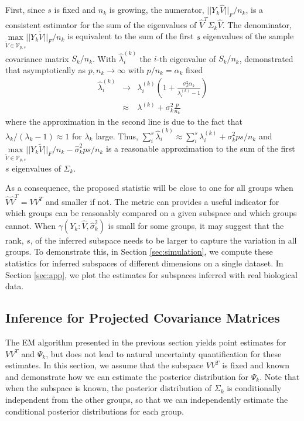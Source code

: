 \documentclass[12pt]{article}
\begin{document}
First, since $s$ is fixed and $n_k$ is growing, the numerator,
$||Y_k\hat{V}||_F/n_k$, is a consistent estimator for the sum of the
eigenvalues of $\hat{V}^T\Sigma_k\hat{V}$.  The denominator,
$\underset{\widetilde{V} \in \mathcal{V}_{p,
    s}}{\text{max}}||Y_k\widetilde{V}||_F/n_k$
is equivalent to the sum of the first $s$ eigenvalues of the sample
covariance matrix $S_k/n_k$.  With $\hat{\lambda}^{(k)}_i$ the
$i$-th eigenvalue of $S_k/n_k$, \citet{Baik2006} demonstrated that
asymptotically as $p, n_k \rightarrow \infty$ with $p/n_k = \alpha_k$
fixed
%
\begin{eqnarray}
\nonumber \hat{\lambda}^{(k)}_i &\rightarrow& \lambda^{(k)}_i\left(1 +
                                    \frac{\sigma_k^2\alpha_k}{\lambda^{(k)}_i
                                    - 1}\right)\\
& \approx& \lambda^{(k)} + \sigma^2_k\frac{p}{n_k}
\end{eqnarray}
%
\noindent where the approximation in the second line is due to the
fact that $\lambda_k/(\lambda_k - 1) \approx 1$ for $\lambda_k$
large. Thus,
$\sum_i^s \hat{\lambda}^{(k)}_i \approx \sum_i^s \lambda^{(k)}_i +
\sigma_k^2ps/n_k$
and $\underset{\widetilde{V} \in \mathcal{V}_{p, s}}{\text{max}}
  ||Y_k\widetilde{V}||_F/n_k - \hat{\sigma}_k^2ps/n_k$ is a reasonable approximation to the sum of the
first $s$ eigenvalues of $\Sigma_k$.

As a consequence, the proposed statistic will be
close to one for all groups when $\hat{V}\hat{V}^T = VV^T$ and smaller
if not.  The metric can provides a useful indicator for which groups
can be reasonably compared on a given subspace and which groups
cannot.  When $\gamma(Y_k: \hat{V}, \hat{\sigma}_k^2)$ is small for
some groups, it may suggest that the rank, $s$, of the inferred
subspace needs to be larger to capture the variation in all groups. To
demonstrate this, in Section \ref{sec:simulation}, we compute these
statistics for inferred subspaces of different dimensions on a single
dataset. In Section \ref{sec:app}, we plot the estimates for subspaces
inferred with real biological data.


\subsection{Inference for Projected Covariance Matrices}
\label{sec:bayes}

The EM algorithm presented in the previous section yields point
estimates for $VV^T$ and $\Psi_k$, but does not lead to natural
uncertainty quantification for these estimates.  In this section, we
assume that the subspace $VV^T$ is fixed and known and demonstrate how
we can estimate the posterior distribution for $\Psi_k$.   Note that when
the subspace is known, the posterior distribution of $\Sigma_k$ is
conditionally independent from the other groups, so that we can
independently estimate the conditional posterior distributions for each
group.
\end{document}
